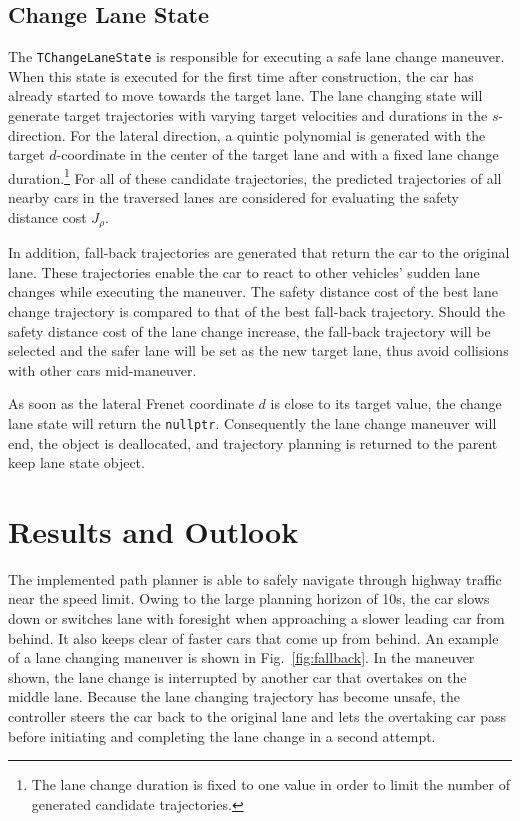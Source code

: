 \documentclass[twoside]{article}
\newcommand{\code}[1]{{\texttt{#1}}}
\newcommand{\figref}[1]{Fig.~\ref{fig:#1}}
\begin{document}
\subsection{Change Lane State}
The \code{TChangeLaneState} is responsible for executing a safe lane change maneuver. When this
state is executed for the first time after construction, the car has already started to move
towards the target lane. The lane changing state will generate target trajectories with varying
target velocities and durations in the $s$-direction. For the lateral direction, a quintic polynomial is generated with the target $d$-coordinate in the center of the target lane and with a fixed lane change duration.\hspace{-0.08em}\footnote{The lane change duration is fixed to one
value in order to limit the number of generated candidate trajectories.} For all of these candidate trajectories, the predicted trajectories of all nearby
cars in the traversed lanes are considered for evaluating the safety distance cost $J_\rho$.

In addition, fall-back trajectories are generated that return the car to the original lane.
These trajectories enable the car to react to other vehicles' sudden
lane changes while executing the maneuver. The safety distance cost of the best lane
change trajectory is compared to that of the best fall-back trajectory. Should the safety
distance cost of the lane change increase, the fall-back trajectory will be selected and the
safer lane will be set as the new target lane, thus avoid collisions with other cars mid-maneuver.

As soon as the lateral Frenet coordinate $d$ is close to its target value, the change lane state
will return the \code{nullptr}. Consequently the lane change maneuver will end, the object is
deallocated, and trajectory planning is returned to the parent keep lane state object.

\section{Results and Outlook}
The implemented path planner is able to safely navigate through highway traffic near the speed
limit. Owing to the large planning horizon of 10s, the car slows down or switches lane with
foresight when approaching a slower leading car from behind. It also keeps clear of faster
cars that come up from behind. An example of a lane changing maneuver is shown in \figref{fallback}. In the maneuver shown, the lane change is interrupted by another car that
overtakes on the middle lane. Because the lane changing trajectory has become unsafe, the
controller steers the car back to the original lane and lets the overtaking car pass before
initiating and completing the lane change in a second attempt.
\end{document}
